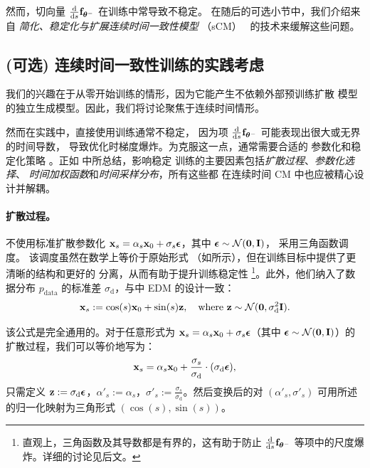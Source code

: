 然而，切向量
$\tfrac{\mathop{}\!\mathrm{d} }{\mathop{}\!\mathrm{d} s}{\mathbf{f}}_{\bm{\theta}^-}$
在训练中常导致不稳定。
在随后的可选小节中，我们介绍来自
\emph{简化、稳定化与扩展连续时间一致性模型}
（sCM）~\citep{lu2024simplifying} 的技术来缓解这些问题。





\subsection{(可选) 连续时间一致性训练的实践考虑}
我们的兴趣在于从零开始训练的情形，因为它能产生不依赖外部预训练扩散
模型的独立生成模型。因此，我们将讨论聚焦于连续时间情形。

然而在实践中，直接使用训练通常不稳定，
因为项 $\tfrac{\mathop{}\!\mathrm{d}}{\mathop{}\!\mathrm{d} s}{\mathbf{f}}_{\bm{\theta}^-}$ 可能表现出很大或无界的时间导数，
导致优化时梯度爆炸。为克服这一点，通常需要合适的
参数化和稳定化策略
\citep{geng2025consistency,lu2024simplifying}。正如
中所总结，影响稳定
训练的主要因素包括\emph{扩散过程}、\emph{参数化选择}、
\emph{时间加权函数}和\emph{时间采样分布}，所有这些都
在连续时间 CM 中也应被精心设计并解耦。




\paragraph{扩散过程。} 不使用标准扩散参数化
${\mathbf{x}}_s = \alpha_s {\mathbf{x}}_0 + \sigma_s \bm{\epsilon}$，其中
$\bm{\epsilon} \sim \mathcal{N}(\bm{0}, {\mathbf{I}})$，
\citet{lu2024simplifying} 采用三角函数调度。
该调度虽然在数学上等价于原始形式
（如所示），但在训练目标中提供了更清晰的结构和更好的
分离，从而有助于提升训练稳定性
\footnote{直观上，三角函数及其导数都是有界的，这有助于防止 $\frac{\mathop{}\!\mathrm{d}}{\mathop{}\!\mathrm{d} s} {\mathbf{f}}_{\bm{\theta}^-}$ 等项中的尺度爆炸。详细的讨论见后文。
}。此外，他们纳入了数据分布 $p_{\mathrm{data}}$ 的标准差 $\sigma_{\mathrm{d}}$，与中 EDM 的设计一致：
\begin{align}\label{eq:trig-scm}
    {\mathbf{x}}_s := \cos(s) {\mathbf{x}}_0 + \sin(s) {\mathbf{z}}, \quad \text{where } {\mathbf{z}} \sim \mathcal{N}(\bm{0}, \sigma_{\mathrm{d}}^2 {\mathbf{I}}).
\end{align}

该公式是完全通用的。对于任意形式为 ${\mathbf{x}}_s = \alpha_s {\mathbf{x}}_0 + \sigma_s \bm{\epsilon}$（其中 $\bm{\epsilon} \sim \mathcal{N}(\bm{0}, {\mathbf{I}})$）的扩散过程，我们可以等价地写为：
\[
{\mathbf{x}}_s = \alpha_s {\mathbf{x}}_0 + \frac{\sigma_s}{\sigma_\mathrm{d}} \cdot (\sigma_{\mathrm{d}} \bm{\epsilon}),
\]
只需定义 ${\mathbf{z}} := \sigma_{\mathrm{d}} \bm{\epsilon}$，$\alpha'_s := \alpha_s$，$\sigma'_s := \frac{\sigma_s}{\sigma_{\mathrm{d}}}$。然后变换后的对 $(\alpha'_s, \sigma'_s)$ 可用所述的归一化映射为三角形式 $(\cos(s), \sin(s))$。


